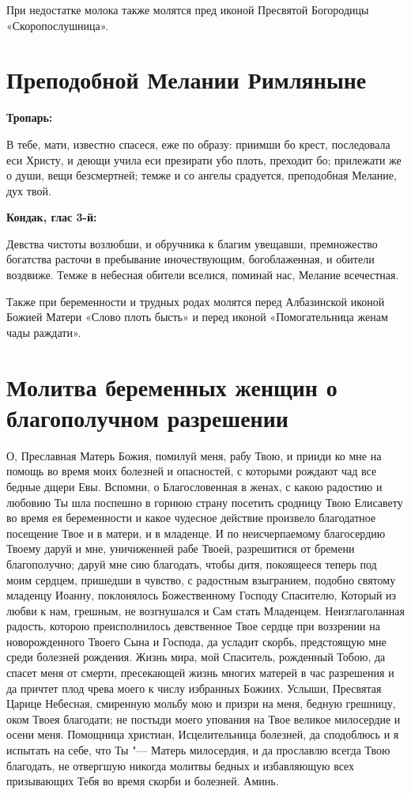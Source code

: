 При недостатке молока также молятся пред иконой Пресвятой Богородицы «Скоропослушница».

\section{Преподобной Мелании Римляныне}
 
\bfseries Тропарь:\normalfont{}


В тебе, мати, известно спасеся, еже по образу: приимши бо крест, последовала еси Христу, и деющи учила еси презирати убо плоть, преходит бо; прилежати же о души, вещи безсмертней; темже и со ангелы срадуется, преподобная Мелание, дух твой.


\medskip
\bfseries Кондак, глас 3-й:\normalfont{}


Девства чистоты возлюбши, и обручника к благим увещавши, премножество богатства расточи в пребывание иночествующим, богоблаженная, и обители воздвиже. Темже в небесная обители вселися, поминай нас, Мелание всечестная.

Также при беременности и трудных родах молятся перед Албазинской иконой Божией Матери «Слово плоть бысть» и перед иконой «Помогательница женам чады раждати».

\section{Молитва беременных женщин о благополучном разрешении}
 


О, Преславная Матерь Божия, помилуй меня, рабу Твою, и прииди ко мне на помощь во время моих болезней и опасностей, с которыми рождают чад все бедные дщери Евы. Вспомни, о Благословенная в женах, с какою радостию и любовию Ты шла поспешно в горнюю страну посетить сродницу Твою Елисавету во время ея беременности и какое чудесное действие произвело благодатное посещение Твое и в матери, и в младенце. И по неисчерпаемому благосердию Твоему даруй и мне, уничиженней рабе Твоей, разрешитися от бремени благополучно; даруй мне сию благодать, чтобы дитя, покоящееся теперь под моим сердцем, пришедши в чувство, с радостным взыгранием, подобно святому младенцу Иоанну, поклонялось Божественному Господу Спасителю, Который из любви к нам, грешным, не возгнушался и Сам стать Младенцем. Неизглаголанная радость, которою преисполнилось девственное Твое сердце при воззрении на новорожденного Твоего Сына и Господа, да усладит скорбь, предстоящую мне среди болезней рождения. Жизнь мира, мой Спаситель, рожденный Тобою, да спасет меня от смерти, пресекающей жизнь многих матерей в час разрешения и да причтет плод чрева моего к числу избранных Божиих. Услыши, Пресвятая Царице Небесная, смиренную мольбу мою и призри на меня, бедную грешницу, оком Твоея благодати; не постыди моего упования на Твое великое милосердие и осени меня. Помощница христиан, Исцелительница болезней, да сподоблюсь и я испытать на себе, что Ты "--- Матерь милосердия, и да прославлю всегда Твою благодать, не отвергшую никогда молитвы бедных и избавляющую всех призывающих Тебя во время скорби и болезней. Аминь. 


